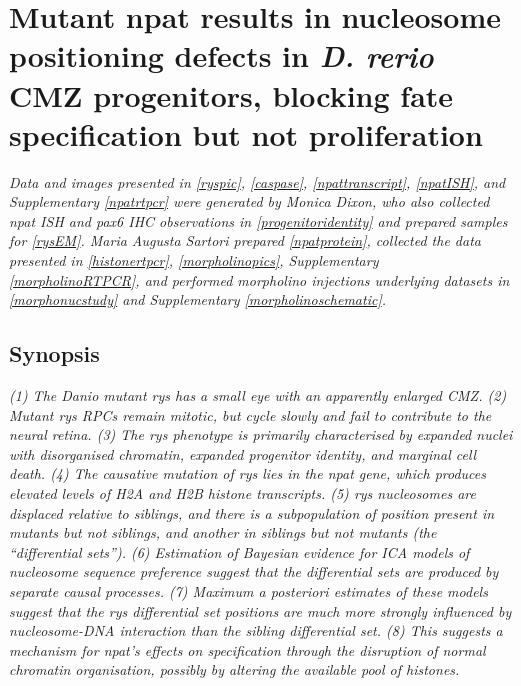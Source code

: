 \chapter{Mutant npat results in nucleosome positioning defects in \textit{D. rerio} CMZ progenitors, blocking fate specification but not proliferation}
\label{chap:rys}

\textit{Data and images presented in \autoref{ryspic}, \autoref{caspase}, \autoref{npattranscript}, \autoref{npatISH}, and Supplementary \autoref{npatrtpcr} were generated by Monica Dixon, who also collected npat ISH and pax6 IHC observations in \autoref{progenitoridentity} and prepared samples for \autoref{rysEM}. Maria Augusta Sartori prepared \autoref{npatprotein}, collected the data presented in \autoref{histonertpcr}, \autoref{morpholinopics}, Supplementary \autoref{morpholinoRTPCR}, and performed morpholino injections underlying datasets in \autoref{morphonucstudy} and Supplementary \autoref{morpholinoschematic}.}

\section*{Synopsis}
\textit{
(1) The \textit{Danio} mutant \emph{rys} has a small eye with an apparently enlarged CMZ. (2) Mutant \emph{rys} RPCs remain mitotic, but cycle slowly and fail to contribute to the neural retina. (3) The \emph{rys} phenotype is primarily characterised by expanded nuclei with disorganised chromatin, expanded progenitor identity, and marginal cell death. (4) The causative mutation of \emph{rys} lies in the npat gene, which produces elevated levels of H2A and H2B histone transcripts. (5) \emph{rys} nucleosomes are displaced relative to siblings, and there is a subpopulation of position present in mutants but not siblings, and another in siblings but not mutants (the ``differential sets''). (6) Estimation of Bayesian evidence for ICA models of nucleosome sequence preference suggest that the differential sets are produced by separate causal processes. (7) Maximum a posteriori estimates of these models suggest that the \emph{rys} differential set positions are much more strongly influenced by nucleosome-DNA interaction than the sibling differential set. (8) This suggests a mechanism for npat's effects on specification through the disruption of normal chromatin organisation, possibly by altering the available pool of histones.
}

